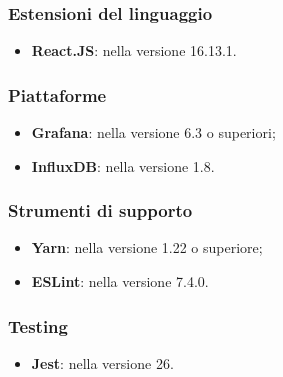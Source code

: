 \documentclass[../manuale-sviluppatore.tex]{subfiles}
\begin{document}
\subsubsection{Estensioni del linguaggio}
\begin{itemize}
  \item \textbf{React.JS}: nella versione 16.13.1.
\end{itemize}

\subsubsection{Piattaforme}
\begin{itemize}
  \item \textbf{Grafana}: nella versione 6.3 o superiori;
  \item \textbf{InfluxDB}: nella versione 1.8.
\end{itemize}

\subsubsection{Strumenti di supporto}
\begin{itemize}
  \item \textbf{Yarn}: nella versione 1.22 o superiore;
  \item \textbf{ESLint}: nella versione 7.4.0.
\end{itemize}

\subsubsection{Testing}
\begin{itemize}
  \item \textbf{Jest}: nella versione 26.
\end{itemize}
\end{document}
